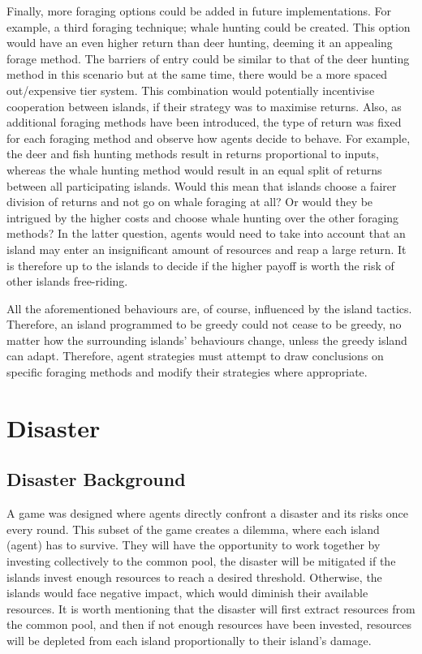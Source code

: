 Finally, more foraging options could be added in future implementations. For example, a third foraging technique; whale hunting could be created. This option would have an even higher return than deer hunting, deeming it an appealing forage method. The barriers of entry could be similar to that of the deer hunting method in this scenario but at the same time, there would be a more spaced out/expensive tier system. This combination would potentially incentivise cooperation between islands, if their strategy was to maximise returns. Also, as additional foraging methods have been introduced, the type of return was fixed for each foraging method and observe how agents decide to behave. For example, the deer and fish hunting methods result in returns proportional to inputs, whereas the whale hunting method would result in an equal split of returns between all participating islands. Would this mean that islands choose a fairer division of returns and not go on whale foraging at all? Or would they be intrigued by the higher costs and choose whale hunting over the other foraging methods? In the latter question, agents would need to take into account that an island may enter an insignificant amount of resources and reap a large return. It is therefore up to the islands to decide if the higher payoff is worth the risk of other islands free-riding.

All the aforementioned behaviours are, of course, influenced by the island tactics. Therefore, an island programmed to be greedy could not cease to be greedy, no matter how the surrounding islands’ behaviours change, unless the greedy island can adapt. Therefore, agent strategies must attempt to draw conclusions on specific foraging methods and modify their strategies where appropriate.

\newpage
\section{Disaster}
\subsection{Disaster Background}

A game was designed where agents directly confront a disaster and its risks once every round. This subset of the game creates a dilemma, where each island (agent) has to survive. They will have the opportunity to work together by investing collectively to the common pool, the disaster will be mitigated if the islands invest enough resources to reach a desired threshold. Otherwise, the islands would face negative impact, which would diminish their available resources. It is worth mentioning that the disaster will first extract resources from the common pool, and then if not enough resources have been invested, resources will be depleted from each island proportionally to their island’s damage.

